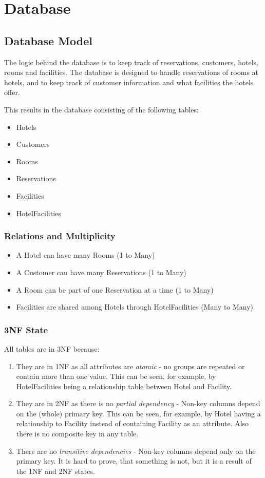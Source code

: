 \chapter{Database}
\label{chapter:the-database}

\section{Database Model}
The logic behind the database is to keep track of reservations, customers, hotels, rooms and facilities.
The database is designed to handle reservations of rooms at hotels, and to keep track of customer information and what facilities the hotels offer.

This results in the database consisting of the following tables:
\begin{itemize}
  \item Hotels
  \item Customers
  \item Rooms
  \item Reservations
  \item Facilities
  \item HotelFacilities
\end{itemize}

\subsection{Relations and Multiplicity}

\begin{itemize}
  \item A Hotel can have many Rooms (1 to Many)
  \item A Customer can have many Reservations (1 to Many)
  \item A Room can be part of one Reservation at a time (1 to Many)
  \item Facilities are shared among Hotels through HotelFacilities (Many to Many)
\end{itemize}

\subsection{3NF State}
All tables are in 3NF because:
\begin{enumerate}
  \item They are in 1NF as all attributes are \emph{atomic} - no groups are repeated or contain more than one value.
      This can be seen, for example, by HotelFacilities being a relationship table between Hotel and Facility.
  \item They are in 2NF as there is no \emph{partial dependency} - Non-key columns depend on the (whole) primary key.
      This can be seen, for example, by Hotel having a relationship to Facility instead of containing Facility as an attribute.
      Also there is no composite key in any table.
  \item There are no \emph{transitive dependencies} - Non-key columns depend only on the primary key.
      It is hard to prove, that something is not, but it is a result of the 1NF and 2NF states.
\end{enumerate}